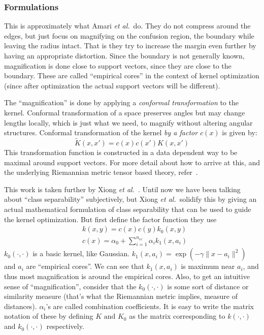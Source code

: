 \documentclass[11pt]{article}
\newcommand{\etal}{{\em et al.}}
\begin{document}
\subsubsection{Formulations}
This is approximately what Amari \etal\ do. They do not compress around the
edges, but just focus on magnifying on the confusion region, the boundary while
leaving the radius intact. That
is they try to increase the margin even further by having an appropriate
distortion. Since the boundary is not generally known, magnification is done
close to support vectors, since they are close to the boundary. These are called
``empirical cores'' in the context of kernel optimization (since after
optimization the actual support vectors will be different).\par
The ``magnification'' is done by applying a {\em conformal transformation} to
the kernel. Conformal transformation of a space preserves angles but may
change lengths locally, which is just what we need, to magnify without altering
angular structures. Conformal transformation of the kernel \textit{by a factor
$c(x)$} is given by:
\[\tilde{K}(x,x')=c(x)c(x')K(x,x')\]
This transformation function is constructed in a data dependent way to be
maximal around support vectors. For more detail about how to arrive at this, and
the underlying Riemannian metric tensor based theory, refer~\cite{amari}.\par
This work is taken further by Xiong \etal~\cite{xiong}. Until now we have been
talking about ``class separability'' subjectively, but Xiong \etal\ solidify
this by giving an actual mathematical formulation of class separability that can
be used to guide the kernel optimization. But first define the factor function
they use
\begin{align*}
    &k(x,y)=c(x)c(y)k_0(x,y)\\
    &c(x)=\alpha_0+\sum_{i=1}^{n_{ec}}\alpha_ik_1(x,a_i)
\end{align*}
$k_0(\cdot,\cdot)$ is a basic kernel, like Gaussian.
$k_1(x,a_i)=\exp(-\gamma\lVert x-a_i\rVert^2)$ and $a_i$ are ``empirical
cores''. We can see that $k_1(x,a_i)$ is maximum near $a_i$, and thus most
magnification is around the empirical cores. Also, to get an intuitive sense of
``magnification'', consider that the $k_0(\cdot,\cdot)$ is some sort of distance
or similarity measure (that's what the Riemannian metric implies, measure of
distances). $\alpha_i$'s are called combination coefficients. It is easy to write
the matrix notation of these by defining $K\text{ and }K_0$ as the matrix
corresponding to $k(\cdot,\cdot)$ and $k_0(\cdot,\cdot)$ respectively.
\end{document}
